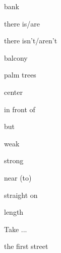 \begin{flashcard}{\LARGE bank}
\LARGE {}
\end{flashcard}
\begin{flashcard}{\LARGE there is/are}
\LARGE {}
\end{flashcard}
\begin{flashcard}{\LARGE there isn't/aren't}
\LARGE {}
\end{flashcard}
\begin{flashcard}{\LARGE balcony}
\LARGE {}
\end{flashcard}
\begin{flashcard}{\LARGE palm trees}
\LARGE {}
\end{flashcard}
\begin{flashcard}{\LARGE center}
\LARGE {}
\end{flashcard}
\begin{flashcard}{\LARGE in front of}
\LARGE {}
\end{flashcard}
\begin{flashcard}{\LARGE but}
\LARGE {}
\end{flashcard}
\begin{flashcard}{\LARGE weak}
\LARGE {}
\end{flashcard}
\begin{flashcard}{\LARGE strong}
\LARGE {}
\end{flashcard}
\begin{flashcard}{\LARGE near (to)}
\LARGE {}
\end{flashcard}
\begin{flashcard}{\LARGE straight on}
\LARGE {}
\end{flashcard}
\begin{flashcard}{\LARGE length}
\LARGE {}
\end{flashcard}
\begin{flashcard}{\LARGE Take ...}
\LARGE {}
\end{flashcard}
\begin{flashcard}{\LARGE the first street}
\LARGE {}
\end{flashcard}
